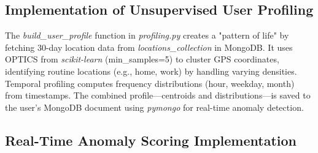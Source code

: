 \documentclass[12pt,a4paper,oneside,english]{book}
\begin{document}
{ \subsection{Implementation of Unsupervised User Profiling}
\label{sec:unsupervised_implementation}
The \textit{build\_user\_profile} function in \textit{profiling.py} creates a "pattern of life" by fetching 30-day location data from \textit{locations\_collection} in MongoDB. 
It uses OPTICS from \textit{scikit-learn} (min\_samples=5) to cluster GPS coordinates, identifying routine locations (e.g., home, work) by handling varying densities. 
Temporal profiling computes frequency distributions (hour, weekday, month) from timestamps. 
The combined profile—centroids and distributions—is saved to the user's MongoDB document using \textit{pymongo} for real-time anomaly detection.


\subsection{Real-Time Anomaly Scoring Implementation}
\label{sec:anomaly_scoring_impl}

}
\end{document}
